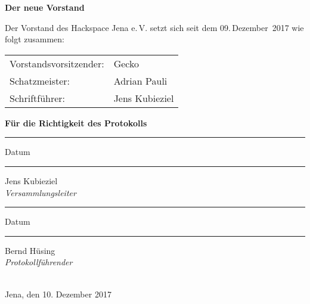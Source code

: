 \documentclass[]{scrartcl}
\newenvironment{eingerueckt}{
\begin{addmargin*}[3ex]{-3ex}
\begin{minipage}{\linewidth}
}{
\end{minipage}
\end{addmargin*}}
\newcommand{\qbi}{Jens Kubieziel}
\newcommand{\berndm}{Bernd Hüsing}
\newcommand{\adrian}{Adrian Pauli}
\newcommand{\gecko}{Gecko}
\begin{document}
\vspace{10mm}
\textbf{\textsf{\large{Der neue Vorstand}}}

Der Vorstand des Hackspace Jena e.\,V. setzt sich seit dem 09.\,Dezember~2017 
wie folgt zusammen:

\vspace{3mm}
\begin{eingerueckt}
\begin{tabular}{ll}
Vorstandsvorsitzender: & \gecko{} \\
Schatzmeister: & \adrian{} \\
Schriftführer: & \qbi{}
\end{tabular}
\end{eingerueckt}

\vspace{10mm}
\textbf{\textsf{\large{Für die Richtigkeit des Protokolls}}} \\[2mm]
\hfill
\begin{minipage}[t]{20mm}
\vspace{22mm}
\hrule
\vspace{2mm}
\small{Datum}
\end{minipage}
\begin{minipage}[t]{50mm}
\vspace{22mm}
\hrule
\vspace{2mm}
\small{\qbi{}\\\textsl{Versammlungsleiter}}
\end{minipage}
\hfill
\begin{minipage}[t]{20mm}
\vspace{22mm}
\hrule
\vspace{2mm}
\small{Datum}
\end{minipage}
\begin{minipage}[t]{50mm}
\vspace{22mm}
\hrule
\vspace{2mm}
\small{\berndm{}\\\textsl{Protokollführender}}
\end{minipage}
\hfill
\\[8mm]
Jena, den 10. Dezember 2017
\end{document}
